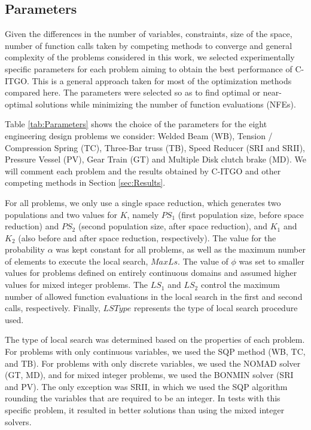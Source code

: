 \subsection{Parameters}

Given the differences in the number of variables, constraints, size of the space, number of function calls taken by competing methods to converge and general complexity of the problems considered in this work, we selected experimentally specific parameters for each problem aiming to obtain the best performance of C-ITGO. This is a general approach taken for most of the optimization methods compared here. The parameters were selected so as to find optimal or near-optimal solutions while minimizing the number of function evaluations (NFEs).

Table \ref{tab:Parameters} shows the choice of the parameters for the eight engineering design problems we consider: Welded Beam (WB), Tension / Compression Spring (TC), Three-Bar truss (TB), Speed Reducer (SRI and SRII), Pressure Vessel (PV), Gear Train (GT) and Multiple Disk clutch brake (MD). We will comment each problem and the results obtained by C-ITGO and other competing methods in Section \ref{sec:Results}.



For all problems, we only use a single space reduction, which generates two populations and two values for $K$, namely $PS_1$ (first population size, before space reduction) and $PS_2$ (second population size, after space reduction), and $K_1$ and $K_2$ (also before and after space reduction, respectively). The value for the probability $\alpha$ was kept constant for all problems, as well as the maximum number of elements to execute the local search, $MaxLs$. The value of $\phi$ was set to smaller values for problems defined on entirely continuous domains and assumed higher values for mixed integer problems. The $LS_1$ and $LS_2$ control the maximum number of allowed function evaluations in the local search in the first and second calls, respectively. Finally, $LSType$ represents the type of local search procedure used. %

The type of local search was determined based on the properties of each problem. For problems with only continuous variables, we used the SQP method (WB, TC, and TB). For problems with only discrete variables, we used the NOMAD solver (GT, MD), and for mixed integer problems, we used the BONMIN solver (SRI and PV). The only exception was SRII, in which we used the SQP algorithm rounding the variables that are required to be an integer. In tests with this specific problem, it resulted in better solutions than using the mixed integer solvers.